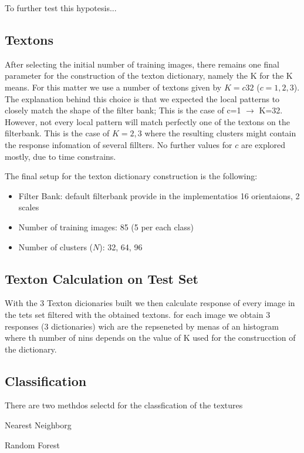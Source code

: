 \documentclass[a4paper]{article}
\begin{document}
To further test this hypotesis...  


\subsection{Textons}
After selecting the initial number of training images, there remains one final parameter for the construction of the texton dictionary, namely the K for the K means. For this matter we use a number of textons given by $K=c32$ ($c={1,2,3}$). The explanation behind this choice is that we expected the local patterns to closely match the shape of the filter bank; This is the case of c=1 $\rightarrow$ K=32. However, not every local pattern will match perfectly one of the textons on the filterbank. This is the case of $K={2,3}$ where the resulting clusters might contain the response infomation of several fillters. No further values for $c$ are explored mostly, due to time constrains.
 
The final setup for the texton dictionary construction is the following:

\begin{itemize}
	\item Filter Bank: default filterbank provide in the implementatios 16 orientaions, 2 scales
	\item Number of training images: 85 (5 per each class)
	\item Number of clusters ($N$):  32, 64, 96
\end{itemize}

\subsection{Texton Calculation on Test Set}

With the 3 Texton dicionaries built we then calculate response of every image in the tets set filtered with the obtained textons. for each image we obtain 3 responses (3 dictionaries) wich are the repseneted by menas of an histogram where th number of nins depends on the value of K used for the construcction of the dictionary.

\subsection{Classification}
There are two methdos selectd for the classfication of the textures

\begin{description}

\item[Nearest Neighborg] \cite{}
\item[Random Forest] \cite{}

\end{description}





\end{document}
